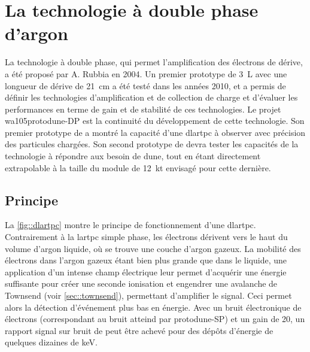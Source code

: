     
  \section{La technologie à double phase d'argon}

    La technologie à double phase, qui permet l'amplification des électrons de dérive, a été proposé par A. Rubbia\cite{Rubbia2004} en 2004. Un premier prototype de \SI{3}{\liter} avec une longueur de dérive de \SI{21}{\centi\meter} a été testé dans les années 2010, et a permis de définir les technologies d'amplification et de collection de charge\cite{Cantini2013} et d'évaluer les performances en terme de gain et de stabilité de ces technologies\cite{Cantini2014}. Le projet \gls{wa105}proto\gls{dune}-DP est la continuité du développement de cette technologie. Son premier prototype de \TOO a montré la capacité d'une \gls{dlartpc} à observer avec précision des particules chargées. Son second prototype de \SSS devra tester les capacités de la technologie à répondre aux besoin de \gls{dune}, tout en étant directement extrapolable à la taille du module de \SI{12}{\kilo\tonne} envisagé pour cette dernière.

    \subsection{Principe}

      La \autoref{fig::dlartpc} montre le principe de fonctionnement d'une \gls{dlartpc}. Contrairement à la \gls{lartpc} simple phase, les électrons dérivent vers le haut du volume d'argon liquide, où se trouve une couche d'argon gazeux. La mobilité des électrons dans l'argon gazeux étant bien plus grande que dans le liquide, une application d'un intense champ électrique leur permet d'acquérir une énergie suffisante pour créer une seconde ionisation et engendrer une avalanche de Townsend (voir \autoref{sec::townsend}), permettant d'amplifier le signal. Ceci permet alors la détection d'événement plus bas en énergie. Avec un bruit électronique de  électrons (correspondant au bruit atteind par proto\gls{dune}-SP) et un gain de 20, un rapport signal sur bruit de  peut être achevé pour des dépôts d'énergie de quelques dizaines de \si{\kilo\eV}.


